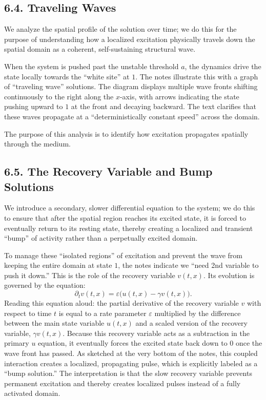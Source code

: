\documentclass[11pt]{article}
\theoremstyle{definition}
\theoremstyle{remark}
\begin{document}
\subsection*{6.4. Traveling Waves}
We analyze the spatial profile of the solution over time; we do this for the purpose of understanding how a localized excitation physically travels down the spatial domain as a coherent, self-sustaining structural wave.

When the system is pushed past the unstable threshold $a$, the dynamics drive the state locally towards the ``white site'' at $1$. The notes illustrate this with a graph of ``traveling wave'' solutions. The diagram displays multiple wave fronts shifting continuously to the right along the $x$-axis, with arrows indicating the state pushing upward to $1$ at the front and decaying backward. The text clarifies that these waves propagate at a ``deterministically constant speed'' across the domain.

The purpose of this analysis is to identify how excitation propagates spatially through the medium.

\subsection*{6.5. The Recovery Variable and Bump Solutions}
We introduce a secondary, slower differential equation to the system; we do this to ensure that after the spatial region reaches its excited state, it is forced to eventually return to its resting state, thereby creating a localized and transient ``bump'' of activity rather than a perpetually excited domain.

To manage these ``isolated regions'' of excitation and prevent the wave from keeping the entire domain at state $1$, the notes indicate we ``need 2nd variable to push it down.'' This is the role of the recovery variable $v(t,x)$. Its evolution is governed by the equation:
\[
\partial_t v(t,x)=\varepsilon\bigl(u(t,x)-\gamma v(t,x)\bigr).
\]
Reading this equation aloud: the partial derivative of the recovery variable $v$ with respect to time $t$ is equal to a rate parameter $\varepsilon$ multiplied by the difference between the main state variable $u(t,x)$ and a scaled version of the recovery variable, $\gamma v(t,x)$. Because this recovery variable acts as a subtraction in the primary $u$ equation, it eventually forces the excited state back down to $0$ once the wave front has passed. As sketched at the very bottom of the notes, this coupled interaction creates a localized, propagating pulse, which is explicitly labeled as a ``bump solution.''
The interpretation is that the slow recovery variable prevents permanent excitation and thereby creates localized pulses instead of a fully activated domain.
\end{document}
